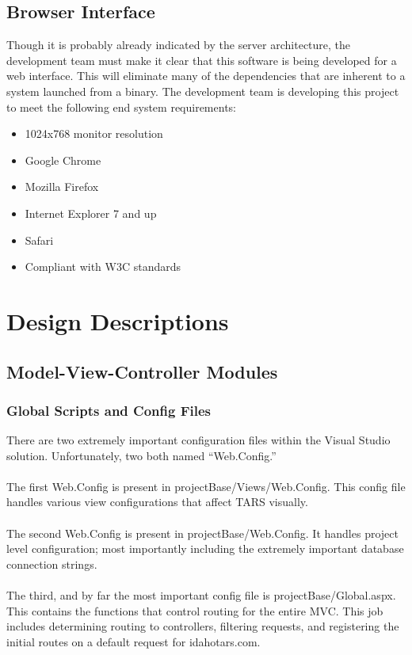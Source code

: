 \documentclass[letterpaper]{article}
\begin{document}
\subsection{Browser Interface}
Though it is probably already indicated by the server architecture, the development team must make it clear that this software is being developed for a web interface. This will eliminate many of the dependencies that are inherent to a system launched from a binary. The development team is developing this project to meet the following end system requirements:
\begin{itemize}
\item 1024x768 monitor resolution
\item Google Chrome
\item Mozilla Firefox
\item Internet Explorer 7 and up
\item Safari
\item Compliant with W3C standards
\end{itemize}
\section{Design Descriptions}
\subsection{Model-View-Controller Modules}
\subsubsection{Global Scripts and Config Files}
There are two extremely important configuration files within the Visual Studio solution. Unfortunately, two both named ``Web.Config.''\\
\\
The first Web.Config is present in projectBase/Views/Web.Config. This config file handles various view configurations that affect TARS visually.\\
\\
The second Web.Config is present in projectBase/Web.Config. It handles project level configuration; most importantly including the extremely important database connection strings. \\
\\
The third, and by far the most important config file is projectBase/Global.aspx.
This contains the functions that control routing for the entire MVC. This job includes determining routing to controllers, filtering requests, and registering the initial routes on a default request for idahotars.com.
\end{document}
